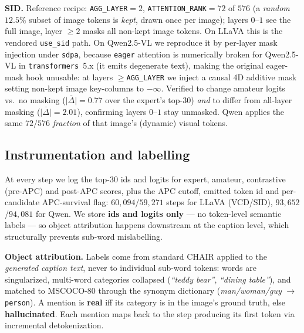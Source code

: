 \documentclass{article}
\begin{document}
\textbf{SID.} Reference recipe: \texttt{AGG\_LAYER}$=2$,
\texttt{ATTENTION\_RANK}$=72$ of $576$ (a \emph{random} $12.5\%$ subset of image
tokens is \emph{kept}, drawn once per image); layers $0$--$1$ see the full
image, layer $\ge2$ masks all non-kept image tokens. On LLaVA this is the
vendored \texttt{use\_sid} path. On Qwen2.5-VL we reproduce it by per-layer
mask injection under \texttt{sdpa}, because \texttt{eager} attention is
numerically broken for Qwen2.5-VL in \texttt{transformers}~5.x (it emits
degenerate text), making the original eager-mask hook unusable: at layers
$\ge$\texttt{AGG\_LAYER} we inject a causal 4D additive mask setting non-kept
image key-columns to $-\infty$. Verified to change amateur logits vs.\ no
masking ($\overline{|\Delta|}=0.77$ over the expert's top-$30$) \emph{and} to
differ from all-layer masking ($\overline{|\Delta|}=2.01$), confirming layers
$0$--$1$ stay unmasked. Qwen applies the same $72/576$ \emph{fraction} of that
image's (dynamic) visual tokens.

\subsection{Instrumentation and labelling}
\label{subsec:cdmech-capture}

At every step we log the top-$30$ ids and logits for expert, amateur,
contrastive (pre-APC) and post-APC scores, plus the APC cutoff, emitted token id
and per-candidate APC-survival flag: $60{,}094$/$59{,}271$ steps for LLaVA
(VCD/SID), $93{,}652$/$94{,}081$ for Qwen. We store \textbf{ids and logits
only} --- no token-level semantic labels --- so object attribution happens
downstream at the caption level, which structurally prevents sub-word
mislabelling.

\textbf{Object attribution.} Labels come from standard CHAIR applied to the
\emph{generated caption text}, never to individual sub-word tokens: words are
singularized, multi-word categories collapsed (\emph{``teddy bear''},
\emph{``dining table''}), and matched to MSCOCO-80 through the synonym
dictionary (\emph{man/woman/guy} $\to$ \texttt{person}). A mention is
\textbf{real} iff its category is in the image's ground truth, else
\textbf{hallucinated}. Each mention maps back to the step producing its first
token via incremental detokenization.
\end{document}
